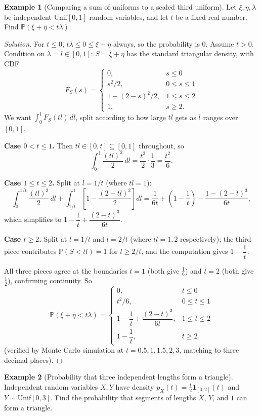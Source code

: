 \documentclass[11pt]{article}
\theoremstyle{definition}
\newtheorem{example}{Example}[section]
\begin{document}
\begin{example}[Comparing a sum of uniforms to a scaled third uniform]
Let $\xi,\eta,\lambda$ be independent $\mathrm{Unif}[0,1]$ random variables, and let $t$ be a fixed real number. Find $\mathbb P(\xi+\eta<t\lambda)$.
\end{example}

\begin{proof}[Solution]
For $t\le0$, $t\lambda\le0\le\xi+\eta$ always, so the probability is $0$. Assume $t>0$. Condition on $\lambda=l\in[0,1]$: $S=\xi+\eta$ has the standard triangular density, with CDF
\[
F_S(s)=\begin{cases}0,&s\le0\\ s^2/2,&0\le s\le1\\ 1-(2-s)^2/2,& 1\le s\le2\\ 1,& s\ge2.\end{cases}
\]
We want $\displaystyle\int_0^1 F_S(tl)\,dl$, split according to how large $tl$ gets as $l$ ranges over $[0,1]$.

\textbf{Case $0<t\le1$.} Then $tl\in[0,t]\subseteq[0,1]$ throughout, so
\[
\int_0^1\frac{(tl)^2}2\,dl=\frac{t^2}2\cdot\frac13=\frac{t^2}6.
\]

\textbf{Case $1\le t\le2$.} Split at $l=1/t$ (where $tl=1$):
\[
\int_0^{1/t}\frac{(tl)^2}2\,dl+\int_{1/t}^1\left[1-\frac{(2-tl)^2}2\right]dl=\frac1{6t}+\left(1-\frac1t\right)-\frac{1-(2-t)^3}{6t},
\]
which simplifies to $1-\dfrac1t+\dfrac{(2-t)^3}{6t}$.

\textbf{Case $t\ge2$.} Split at $l=1/t$ and $l=2/t$ (where $tl=1,2$ respectively); the third piece contributes $\mathbb P(S<tl)=1$ for $l\ge2/t$, and the computation gives $1-\dfrac1t$.

All three pieces agree at the boundaries $t=1$ (both give $\tfrac16$) and $t=2$ (both give $\tfrac12$), confirming continuity. So
\[
\boxed{\mathbb P(\xi+\eta<t\lambda)=\begin{cases}0,& t\le0\\[2pt] t^2/6,& 0\le t\le1\\[2pt] 1-\dfrac1t+\dfrac{(2-t)^3}{6t},& 1\le t\le2\\[2pt] 1-\dfrac1t,& t\ge2\end{cases}}
\]
(verified by Monte Carlo simulation at $t=0.5,1,1.5,2,3$, matching to three decimal places).
\end{proof}

\begin{example}[Probability that three independent lengths form a triangle]
Independent random variables $X,Y$ have density $p_X(t)=\tfrac t2\mathbf1_{[0,2]}(t)$ and $Y\sim\mathrm{Unif}[0,3]$. Find the probability that segments of lengths $X$, $Y$, and $1$ can form a triangle.
\end{example}
\end{document}
